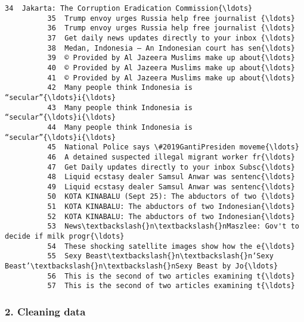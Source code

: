 \documentclass[11pt]{article}
\begin{document}
\begin{Verbatim}[commandchars=\\\{\}]
          34  Jakarta: The Corruption Eradication Commission{\ldots}  
          35  Trump envoy urges Russia help free journalist {\ldots}  
          36  Trump envoy urges Russia help free journalist {\ldots}  
          37  Get daily news updates directly to your inbox {\ldots}  
          38  Medan, Indonesia — An Indonesian court has sen{\ldots}  
          39  © Provided by Al Jazeera Muslims make up about{\ldots}  
          40  © Provided by Al Jazeera Muslims make up about{\ldots}  
          41  © Provided by Al Jazeera Muslims make up about{\ldots}  
          42  Many people think Indonesia is “secular”{\ldots}i{\ldots}  
          43  Many people think Indonesia is “secular”{\ldots}i{\ldots}  
          44  Many people think Indonesia is “secular”{\ldots}i{\ldots}  
          45  National Police says \#2019GantiPresiden moveme{\ldots}  
          46  A detained suspected illegal migrant worker fr{\ldots}  
          47  Get Daily updates directly to your inbox Subsc{\ldots}  
          48  Liquid ecstasy dealer Samsul Anwar was sentenc{\ldots}  
          49  Liquid ecstasy dealer Samsul Anwar was sentenc{\ldots}  
          50  KOTA KINABALU (Sept 25): The abductors of two {\ldots}  
          51  KOTA KINABALU: The abductors of two Indonesian{\ldots}  
          52  KOTA KINABALU: The abductors of two Indonesian{\ldots}  
          53  News\textbackslash{}n\textbackslash{}nMaszlee: Gov't to decide if milk progr{\ldots}  
          54  These shocking satellite images show how the e{\ldots}  
          55  Sexy Beast\textbackslash{}n\textbackslash{}n‘Sexy Beast’\textbackslash{}n\textbackslash{}nSexy Beast by Jo{\ldots}  
          56  This is the second of two articles examining t{\ldots}  
          57  This is the second of two articles examining t{\ldots}  
\end{Verbatim}
            
    \subsubsection{2. Cleaning data}\label{cleaning-data}
\end{document}

